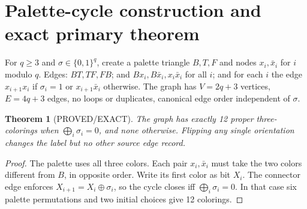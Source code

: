 \documentclass[11pt]{article}
\newtheorem{theorem}{Theorem}
\begin{document}
\section*{Palette-cycle construction and exact primary theorem}
For $q\ge3$ and $\sigma\in\{0,1\}^q$, create a palette triangle $B,T,F$ and nodes $x_i,\bar x_i$ for $i$ modulo $q$. Edges: $BT,TF,FB$; and $Bx_i,B\bar x_i,x_i\bar x_i$ for all $i$; and for each $i$ the edge $x_{i+1}x_i$ if $\sigma_i=1$ or $x_{i+1}\bar x_i$ otherwise. The graph has $V=2q+3$ vertices, $E=4q+3$ edges, no loops or duplicates, canonical edge order independent of $\sigma$.
\begin{theorem}[PROVED/EXACT]
The graph has exactly 12 proper three-colorings when $\bigoplus_i\sigma_i=0$, and none otherwise. Flipping any single orientation changes the label but no other source edge record.
\end{theorem}
\begin{proof}
The palette uses all three colors. Each pair $x_i,\bar x_i$ must take the two colors different from $B$, in opposite order. Write its first color as bit $X_i$. The connector edge enforces $X_{i+1}=X_i\oplus\sigma_i$, so the cycle closes iff $\bigoplus_i\sigma_i=0$. In that case six palette permutations and two initial choices give 12 colorings.
\end{proof}
\end{document}
